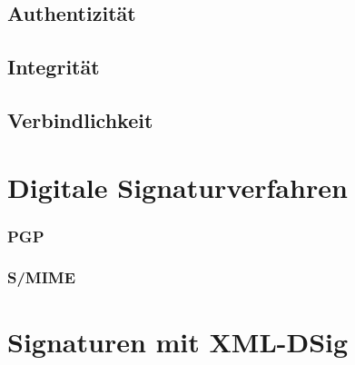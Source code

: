 \subsection{Authentizität}

\subsection{Integrität}

\subsection{Verbindlichkeit}

\section{Digitale Signaturverfahren}
\label{sec:GrundlagenDefinitionen:DigitaleSignaturen:Verfahren}

\subsubsection{PGP}
\label{sec:GrundlagenDefinitionen:DigitaleSignaturen:Verfahren:pgp}

\subsubsection{S/MIME}
\label{sec:GrundlagenDefinitionen:DigitaleSignaturen:Verfahren:smime}

\section{Signaturen mit XML-DSig}
\label{sec:GrundlagenDefinitionen:xml-dsig}

